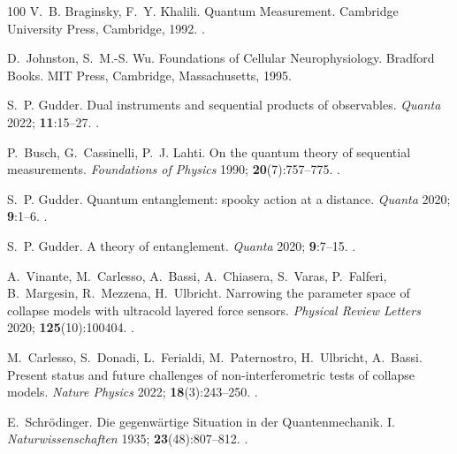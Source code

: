 \documentclass{ws-ijmpb}
\begin{document}
\begin{thebibliography}{100}
V.~B. Braginsky, F.~Y. Khalili. Quantum Measurement. Cambridge University
  Press, Cambridge, 1992.
\newblock \href {http://doi.org/10.1017/cbo9780511622748}
  {}.

D.~Johnston, S.~M.-S. Wu. Foundations of Cellular Neurophysiology. Bradford
  Books. MIT Press, Cambridge, Massachusetts, 1995.

S.~P. Gudder. Dual instruments and sequential products of observables.
  \emph{Quanta} 2022; \textbf{11}:15--27.
\newblock \href {http://doi.org/10.12743/quanta.v11i1.197}
  {}.

P.~Busch, G.~Cassinelli, P.~J. Lahti. On the quantum theory of sequential
  measurements. \emph{Foundations of Physics} 1990; \textbf{20}(7):757--775.
\newblock \href {http://doi.org/10.1007/BF01889690}
  {}.

S.~P. Gudder. Quantum entanglement: spooky action at a distance. \emph{Quanta}
  2020; \textbf{9}:1--6.
\newblock \href {http://doi.org/10.12743/quanta.v9i1.113}
  {}.

S.~P. Gudder. A theory of entanglement. \emph{Quanta} 2020; \textbf{9}:7--15.
\newblock \href {http://doi.org/10.12743/quanta.v9i1.115}
  {}.

A.~Vinante, M.~Carlesso, A.~Bassi, A.~Chiasera, S.~Varas, P.~Falferi,
  B.~Margesin, R.~Mezzena, H.~Ulbricht. Narrowing the parameter space of
  collapse models with ultracold layered force sensors. \emph{Physical Review
  Letters} 2020; \textbf{125}(10):100404.
\newblock \href {http://doi.org/10.1103/PhysRevLett.125.100404}
  {}.

M.~Carlesso, S.~Donadi, L.~Ferialdi, M.~Paternostro, H.~Ulbricht, A.~Bassi.
  Present status and future challenges of non-interferometric tests of collapse
  models. \emph{Nature Physics} 2022; \textbf{18}(3):243--250.
\newblock \href {http://doi.org/10.1038/s41567-021-01489-5}
  {}.

E.~Schr\"{o}dinger. Die gegenw\"{a}rtige {S}ituation in der {Q}uantenmechanik.
  {I}. \emph{Naturwissenschaften} 1935; \textbf{23}(48):807--812.
\newblock \href {http://doi.org/10.1007/bf01491891}
  {}.


\end{thebibliography}
\end{document}
